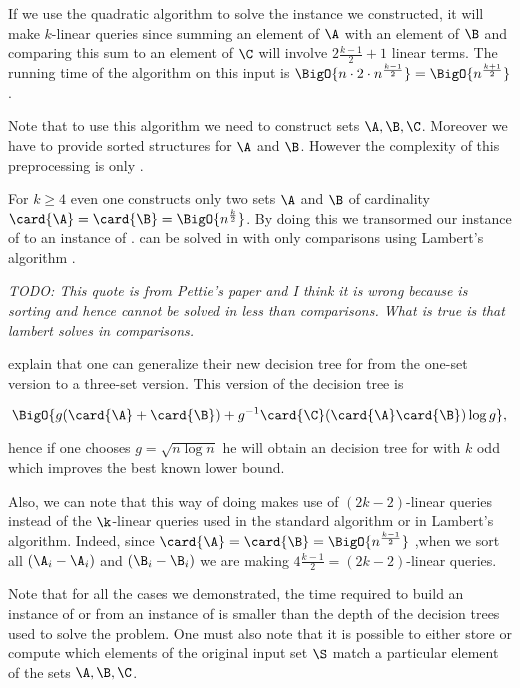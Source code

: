 If we use the quadratic \threeSUM algorithm to solve the instance we
constructed, it will make \(k\)-linear queries since summing an element of
\(\A\) with an element of \(\B\) and comparing this sum to an element of
\(\C\) will involve \(2 \frac{k-1}{2} + 1\) linear terms. The running time of
the \threeSUM algorithm on this input is \(\BigO{n \cdot 2 \cdot n^{\frac{k-1}{2}}} =
\BigO{n^{\frac{k+1}{2}}}\).

Note that to use this algorithm we need to construct sets \(\A,\B,\C\).
Moreover we have to provide sorted structures for \(\A\) and \(\B\). However
the complexity of this preprocessing is only .

For \(k \ge 4\) even one constructs only two sets \(\A\) and \(\B\) of
cardinality \(\card{\A} = \card{\B} = \BigO{n^{\frac{k}{2}}}\). By doing this
we transormed our instance of \kLDT to an instance of \twoSUM. \twoSUM can be
solved in  with only 
comparisons using Lambert's algorithm \cite{lambert:1990}.

\emph{TODO: This quote is from Pettie's paper and I think it is wrong because
\twoSUM is sorting and hence cannot be solved in less than 
comparisons. What is true is that lambert solves \fourSUM in 
comparisons.}

\citet*{gronlund:2014} explain that one can generalize their new decision tree
for \threeSUM from the one-set version to a three-set version. This version of
the decision tree is

\begin{displaymath}
\BigO{g(\card{\A}+\card{\B}) + g^{-1}\card{\C}(\card{\A}\card{\B})\log g},
\end{displaymath}

hence if one chooses \(g = \sqrt{n \log n}\) he will obtain an
 decision tree for \kLDT with $k$ odd
which improves the best known lower bound.

Also, we can note that this way of doing makes use of \((2k-2)\)-linear queries
instead of the \(\k\)-linear queries used in the standard \threeSUM
algorithm or in Lambert's algorithm. Indeed, since \(\card{\A} = \card{\B} =
\BigO{n^{\frac{k-1}{2}}}\) ,when we sort all \((\A_i - \A_i)\) and \((\B_i -
\B_i)\) we are making \(4 \frac{k-1}{2} = (2k-2)\)-linear queries.

Note that for all the cases we demonstrated, the time required to build an
instance of \twoSUM or \threeSUM from an instance of \kLDT is smaller than the
depth of the decision trees used to solve the problem. One must also note that
it is possible to either store or compute which elements of the original input
set \(\S\) match a particular element of the sets \(\A,\B,\C\).
